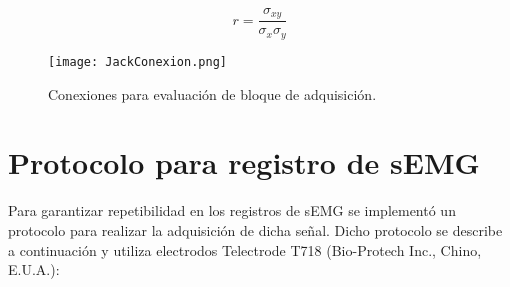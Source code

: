 \begin{equation}
	r = \frac{\sigma_{xy}}{\sigma_{x}\sigma_{y}}
	\label{Ecu: CorrePea}
\end{equation}

\begin{figure}
	\centering
	\texttt{[image: JackConexion.png]}
	\caption{Conexiones para evaluación de bloque de adquisición.}
	\label{Figura: JackConexion}
\end{figure}

\newpage
\section{Protocolo para registro de sEMG}\label{Sec: ProReg}
Para garantizar repetibilidad en los registros de sEMG se implementó un protocolo para realizar la adquisición de dicha señal. Dicho protocolo se describe a continuación y utiliza electrodos Telectrode T718 (Bio-Protech Inc., Chino, E.U.A.):

